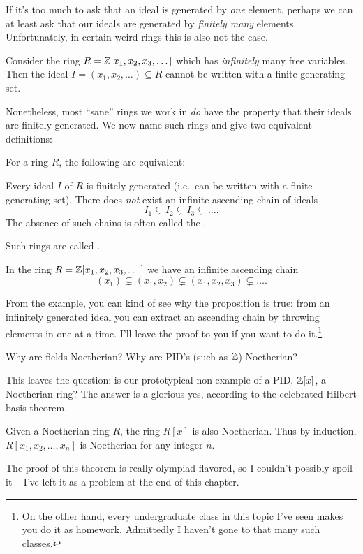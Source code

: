 If it's too much to ask that an ideal is generated by \emph{one} element,
perhaps we can at least ask that our ideals are generated by \emph{finitely many} elements.
Unfortunately, in certain weird rings this is also not the case.
\begin{example}
	Consider the ring $R = \mathbb Z[x_1, x_2, x_3, \dots]$
	which has \emph{infinitely} many free variables.
	Then the ideal $I = (x_1, x_2, \dots) \subseteq R$
	cannot be written with a finite generating set.
\end{example}
Nonetheless, most ``sane'' rings we work in \emph{do} have the property that their ideals are finitely generated.
We now name such rings and give two equivalent definitions:
\begin{proposition}
	For a ring $R$, the following are equivalent:
	\begin{enumerate}[(a)]
		\ii Every ideal $I$ of $R$ is finitely generated (i.e.\ can be written with a finite generating set).
		\ii There does \emph{not} exist an infinite ascending chain of ideals
		\[ I_1 \subsetneq I_2 \subsetneq I_3 \subsetneq \dots. \]
		The absence of such chains is often called the .
	\end{enumerate}
	Such rings are called .
\end{proposition}
\begin{example}
	In the ring $R = \mathbb Z[x_1, x_2, x_3, \dots]$ we have
	an infinite ascending chain
	\[ (x_1) \subsetneq (x_1, x_2) \subsetneq (x_1,x_2,x_3) \subsetneq \dots. \]
\end{example}
From the example, you can kind of see why the proposition is true:
from an infinitely generated ideal you can extract an ascending chain
by throwing elements in one at a time.
I'll leave the proof to you if you want to do it.\footnote{On the other hand, every undergraduate class in this topic I've seen makes you do it as homework. Admittedly I haven't gone to that many such classes.}

\begin{ques}
	Why are fields Noetherian?
	Why are PID's (such as $\mathbb Z$) Noetherian?
\end{ques}
This leaves the question:
is our prototypical non-example of a PID,
$\mathbb Z[x]$, a Noetherian ring?
The answer is a glorious yes,
according to the celebrated Hilbert basis theorem.
\begin{theorem}
	Given a Noetherian ring $R$,
	the ring $R[x]$ is also Noetherian.
	Thus by induction, $R[x_1, x_2, \dots, x_n]$ is Noetherian
	for any integer $n$.
	\label{thm:hilbert_basis}
\end{theorem}
The proof of this theorem is really olympiad flavored, so I couldn't possibly spoil it -- I've
left it as a problem at the end of this chapter.

